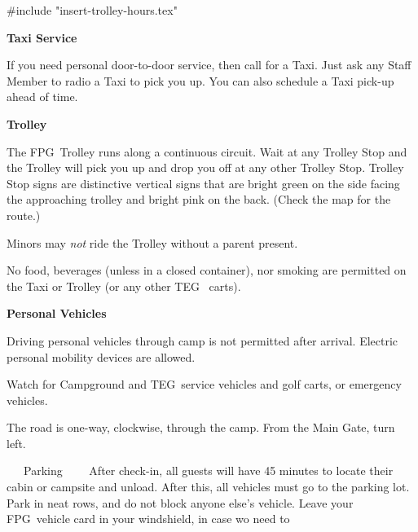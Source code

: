 \documentclass[9pt,twoside,openright,final,article]{memoir}
\def\fpg{{\beltanefamily FPG\ }}
\def\teg{{\hminfamily TEG\ }}
\renewcommand{\pfbreakdisplay}{%
  \needspace{24pt}%
  \vspace{8pt}\\\ding{76}\quad\ding{77}\quad\ding{78}\\%
  \vspace{11pt}}
\renewcommand{\subsection}[1]{%
  \vspace{6pt}%
  \needspace{1.25in}%
  \begin{center}\textbf{\Large \beltanefamily #1}\end{center}

  \nopagebreak}
\renewcommand{\subsubsection}[1]{%
  \vspace{1pt}\needspace{1.5in}
  {\large ~~~\beltanefamily #1~~~\ }
  \nopagebreak}
\begin{document}
\begin{multicols}{2}
  #include "insert-trolley-hours.tex"


  \subsection{Taxi Service}

  If you need personal door-to-door service, then call for a
  Taxi. Just ask any Staff Member to radio a Taxi to pick you up. You
  can also schedule a Taxi pick-up ahead of time.

  \subsection{Trolley}

  The \fpg Trolley runs along a continuous circuit. Wait at any
  Trolley Stop and the Trolley will pick you up and drop you off at
  any other Trolley Stop. Trolley Stop signs are distinctive vertical
  signs that are bright green on the side facing the approaching
  trolley and bright pink on the back. (Check the map for the route.)

  Minors may \emph{not} ride the Trolley without a parent present.

  No food, beverages ({\small unless in a closed container}), nor
  smoking are permitted on the Taxi or Trolley (or any other \teg
  carts).




  \subsection{Personal Vehicles}


  Driving personal vehicles through camp is not permitted after
  arrival.  Electric personal mobility devices are allowed.

  Watch for Campground and \teg service vehicles and golf carts, or
  emergency vehicles.

  The road is one-way, clockwise, through the camp. From the Main
  Gate, turn left.

  \subsubsection{Parking} After check-in, all guests will have 45
  minutes to locate their cabin or campsite and unload. After this,
  all vehicles must go to the parking lot. Park in neat rows, and do
  not block anyone else's vehicle.  Leave your \fpg vehicle card in
  your windshield, in case wo need to


\end{multicols}
\end{document}
